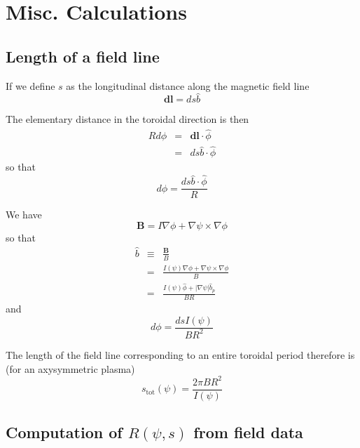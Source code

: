 \documentclass[12pt]{article}
\begin{document}
\section{Misc. Calculations}

\subsection{Length of a field line}

If we define $s$ as the longitudinal distance along the magnetic field line 
\begin{equation}
\mathbf{dl}=ds\widehat{b}
\end{equation}

The elementary distance in the toroidal direction is then 
\begin{eqnarray}
Rd\phi &=&\mathbf{dl}\cdot \widehat{\phi } \\
&=&ds\widehat{b}\cdot \widehat{\phi }
\end{eqnarray}
so that 
\begin{equation}
d\phi =\frac{ds\widehat{b}\cdot \widehat{\phi }}{R}
\end{equation}

We have 
\begin{equation}
\mathbf{B}=I\nabla \phi +\nabla \psi \times \nabla \phi
\end{equation}
so that 
\begin{eqnarray}
\widehat{b} &\equiv &\frac{\mathbf{B}}{B} \\
&=&\frac{I\left( \psi \right) \nabla \phi +\nabla \psi \times \nabla \phi }{B%
} \\
&=&\frac{I\left( \psi \right) \widehat{\phi }+\left| \nabla \psi \right| 
\widehat{b}_{p}}{BR}
\end{eqnarray}
and 
\begin{equation}
d\phi =\frac{dsI\left( \psi \right) }{BR^{2}}
\end{equation}

The length of the field line corresponding to an entire toroidal period
therefore is (for an axysymmetric plasma) 
\begin{equation}
s_{\text{tot}}\left( \psi \right) =\frac{2\pi BR^{2}}{I\left( \psi \right) }
\end{equation}

\subsection{Computation of $R\left( \psi ,s\right) $ from field data}
\end{document}
